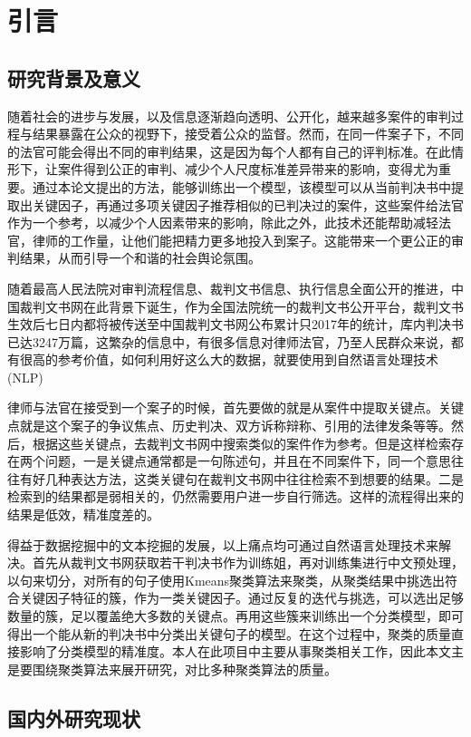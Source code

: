 \section{引言}

\subsection{研究背景及意义}
随着社会的进步与发展，以及信息逐渐趋向透明、公开化，越来越多案件的审判过程与结果暴露在公众的视野下，接受着公众的监督。然而，在同一件案子下，不同的法官可能会得出不同的审判结果，这是因为每个人都有自己的评判标准。在此情形下，让案件得到公正的审判、减少个人尺度标准差异带来的影响，变得尤为重要。通过本论文提出的方法，能够训练出一个模型，该模型可以从当前判决书中提取出关键因子，再通过多项关键因子推荐相似的已判决过的案件，这些案件给法官作为一个参考，以减少个人因素带来的影响，除此之外，此技术还能帮助减轻法官，律师的工作量，让他们能把精力更多地投入到案子。这能带来一个更公正的审判结果，从而引导一个和谐的社会舆论氛围。

随着最高人民法院对审判流程信息、裁判文书信息、执行信息全面公开的推进，中国裁判文书网在此背景下诞生，作为全国法院统一的裁判文书公开平台，裁判文书生效后七日内都将被传送至中国裁判文书网公布累计只2017年的统计，库内判决书已达3247万篇\cite{WEB:judgement}，这繁杂的信息中，有很多信息对律师法官，乃至人民群众来说，都有很高的参考价值，如何利用好这么大的数据，就要使用到自然语言处理技术(NLP)

律师与法官在接受到一个案子的时候，首先要做的就是从案件中提取关键点。关键点就是这个案子的争议焦点、历史判决、双方诉称辩称、引用的法律发条等等。然后，根据这些关键点，去裁判文书网中搜索类似的案件作为参考。但是这样检索存在两个问题，一是关键点通常都是一句陈述句，并且在不同案件下，同一个意思往往有好几种表达方法，这类关键句在裁判文书网中往往检索不到想要的结果。二是检索到的结果都是弱相关的，仍然需要用户进一步自行筛选。这样的流程得出来的结果是低效，精准度差的。

得益于数据挖掘中的文本挖掘的发展，以上痛点均可通过自然语言处理技术来解决。首先从裁判文书网获取若干判决书作为训练姐，再对训练集进行中文预处理，以句来切分，对所有的句子使用Kmeans聚类算法来聚类，从聚类结果中挑选出符合关键因子特征的簇，作为一类关键因子。通过反复的迭代与挑选，可以选出足够数量的簇，足以覆盖绝大多数的关键点。再用这些簇来训练出一个分类模型，即可得出一个能从新的判决书中分类出关键句子的模型。在这个过程中，聚类的质量直接影响了分类模型的精准度。本人在此项目中主要从事聚类相关工作，因此本文主是要围绕聚类算法来展开研究，对比多种聚类算法的质量。

\subsection{国内外研究现状}



